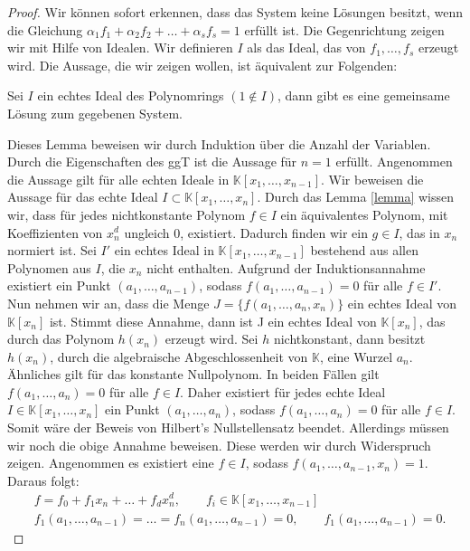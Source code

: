 \begin{proof}
Wir können sofort erkennen, dass das System keine Lösungen besitzt, wenn die Gleichung $\alpha_1f_1 + \alpha_2f_2+ \ldots + \alpha_sf_s = 1$  erfüllt ist. Die Gegenrichtung zeigen wir mit Hilfe von Idealen. Wir definieren $I$ als das Ideal, das von $f_1,\ldots,f_s$ erzeugt wird. Die Aussage, die wir zeigen wollen, ist äquivalent zur Folgenden:
\begin{lemma}
Sei $I$ ein echtes Ideal des Polynomrings $(1 \notin I)$, dann gibt es eine gemeinsame Lösung zum gegebenen System.
\end{lemma}    
\noindent Dieses Lemma beweisen wir durch Induktion über die Anzahl der Variablen. Durch die Eigenschaften des ggT ist die Aussage für $n = 1$ erfüllt. Angenommen die Aussage gilt für alle echten Ideale in $\mathbb{K}[x_1,\ldots,x_{n-1}]$. Wir beweisen die Aussage für das echte Ideal $I \subset \mathbb{K}[x_1,\ldots,x_n]$. Durch das Lemma \ref{lemma} wissen wir, dass für jedes nichtkonstante Polynom $f \in I$ ein äquivalentes Polynom, mit Koeffizienten von $x_n^d$ ungleich 0, existiert. Dadurch finden wir ein $g \in I$, das in $x_n$ normiert ist. Sei $I'$ ein echtes Ideal in $\mathbb{K}[x_1,\ldots,x_{n-1}]$ bestehend aus allen Polynomen aus $I$, die $x_n$ nicht enthalten. Aufgrund der Induktionsannahme existiert ein Punkt $(a_1,\ldots,a_{n-1})$, sodass $f(a_1,\ldots,a_{n-1})=0$ für alle $f \in I'$. Nun nehmen wir an, dass die Menge $J = \{f(a_1,\ldots,a_n,x_n)\}$ ein echtes Ideal von $\mathbb{K}[x_n]$ ist. Stimmt diese Annahme, dann ist J ein echtes Ideal von $\mathbb{K}[x_n]$, das durch das Polynom $h(x_n)$ erzeugt wird. Sei $h$ nichtkonstant, dann besitzt $h(x_n)$, durch die algebraische Abgeschlossenheit von $\mathbb{K}$, eine Wurzel $a_n$. Ähnliches gilt für das konstante Nullpolynom. In beiden Fällen gilt $f(a_1,\ldots,a_{n})=0$ für alle $f \in I$. Daher existiert für jedes echte Ideal $I \in \mathbb{K}[x_1,\ldots,x_{n}]$ ein Punkt $(a_1,\ldots,a_{n})$, sodass $f(a_1,\ldots,a_{n})=0$ für alle $f \in I$. Somit wäre der Beweis von Hilbert's Nullstellensatz beendet. Allerdings müssen wir noch die obige Annahme beweisen. Diese werden wir durch Widerspruch zeigen. Angenommen es existiert eine $f \in I$, sodass $f(a_1,\ldots,a_{n-1},x_n)=1$. Daraus folgt: 
\begin{align*}
&f = f_0 + f_1x_n +\ldots+ f_dx_n^d, \qquad f_i \in \mathbb{K}[x_1,\ldots,x_{n-1}] \\
&f_1(a_1,\ldots,a_{n-1})=\ldots=f_n(a_1,\ldots,a_{n-1})=0, \qquad f_1(a_1,\ldots,a_{n-1})=0.
\end{align*}

\end{proof}
